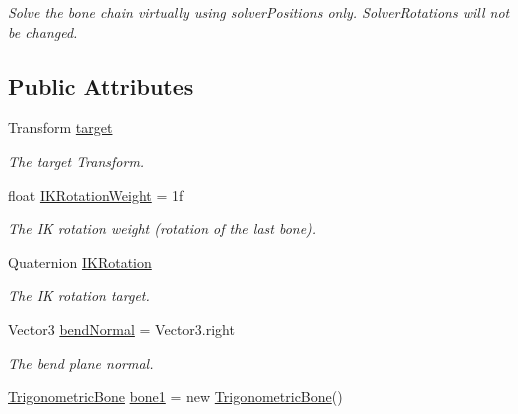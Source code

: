 \begin{DoxyCompactItemize}
\begin{DoxyCompactList}\small\item\em Solve the bone chain virtually using solver\+Positions only. Solver\+Rotations will not be changed. \end{DoxyCompactList}\end{DoxyCompactItemize}
\subsection*{Public Attributes}
\begin{DoxyCompactItemize}
\item 
Transform \mbox{\hyperlink{class_root_motion_1_1_final_i_k_1_1_i_k_solver_trigonometric_a8c8abfb565283f247f5d88397f2d48f5}{target}}
\begin{DoxyCompactList}\small\item\em The target Transform. \end{DoxyCompactList}\item 
float \mbox{\hyperlink{class_root_motion_1_1_final_i_k_1_1_i_k_solver_trigonometric_a7b5dab28356e31e231925dd7a5d8d86b}{I\+K\+Rotation\+Weight}} = 1f
\begin{DoxyCompactList}\small\item\em The IK rotation weight (rotation of the last bone). \end{DoxyCompactList}\item 
Quaternion \mbox{\hyperlink{class_root_motion_1_1_final_i_k_1_1_i_k_solver_trigonometric_a0d249cfdfed0e0fbdae6a4429c6bfcf7}{I\+K\+Rotation}}
\begin{DoxyCompactList}\small\item\em The IK rotation target. \end{DoxyCompactList}\item 
Vector3 \mbox{\hyperlink{class_root_motion_1_1_final_i_k_1_1_i_k_solver_trigonometric_ae48bca2ec4e7a16ffaf196ea956be5e9}{bend\+Normal}} = Vector3.\+right
\begin{DoxyCompactList}\small\item\em The bend plane normal. \end{DoxyCompactList}\item 
\mbox{\hyperlink{class_root_motion_1_1_final_i_k_1_1_i_k_solver_trigonometric_1_1_trigonometric_bone}{Trigonometric\+Bone}} \mbox{\hyperlink{class_root_motion_1_1_final_i_k_1_1_i_k_solver_trigonometric_a3c29124b8fc59d81406c2ce57da202eb}{bone1}} = new \mbox{\hyperlink{class_root_motion_1_1_final_i_k_1_1_i_k_solver_trigonometric_1_1_trigonometric_bone}{Trigonometric\+Bone}}()

\end{DoxyCompactItemize}
